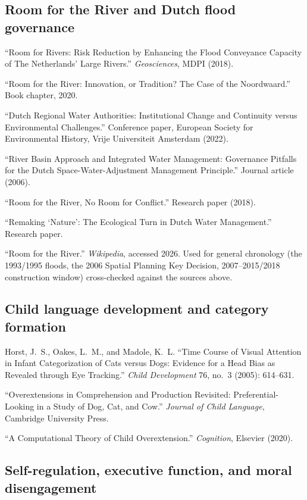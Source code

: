 \subsection*{Room for the River and Dutch flood governance}

``Room for Rivers: Risk Reduction by Enhancing the Flood Conveyance Capacity of The Netherlands' Large Rivers.'' \emph{Geosciences}, MDPI (2018).

``Room for the River: Innovation, or Tradition? The Case of the Noordwaard.'' Book chapter, 2020.

``Dutch Regional Water Authorities: Institutional Change and Continuity versus Environmental Challenges.'' Conference paper, European Society for Environmental History, Vrije Universiteit Amsterdam (2022).

``River Basin Approach and Integrated Water Management: Governance Pitfalls for the Dutch Space-Water-Adjustment Management Principle.'' Journal article (2006).

``Room for the River, No Room for Conflict.'' Research paper (2018).

``Remaking `Nature': The Ecological Turn in Dutch Water Management.'' Research paper.

``Room for the River.'' \emph{Wikipedia}, accessed 2026. Used for general chronology (the 1993/1995 floods, the 2006 Spatial Planning Key Decision, 2007--2015/2018 construction window) cross-checked against the sources above.

\subsection*{Child language development and category formation}

Horst, J.~S., Oakes, L.~M., and Madole, K.~L. ``Time Course of Visual Attention in Infant Categorization of Cats versus Dogs: Evidence for a Head Bias as Revealed through Eye Tracking.'' \emph{Child Development} 76, no.~3 (2005): 614--631.

``Overextensions in Comprehension and Production Revisited: Preferential-Looking in a Study of Dog, Cat, and Cow.'' \emph{Journal of Child Language}, Cambridge University Press.

``A Computational Theory of Child Overextension.'' \emph{Cognition}, Elsevier (2020).

\subsection*{Self-regulation, executive function, and moral disengagement}


